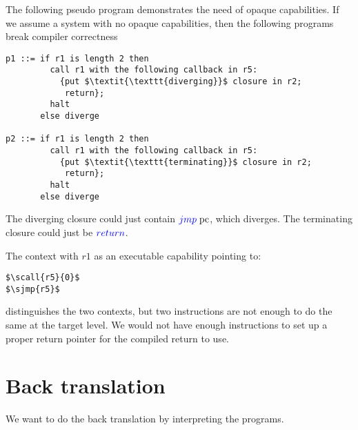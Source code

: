 \documentclass[a4paper]{article}
\newcommand{\sourcecolor}[1]{\color{blue}}
\newcommand{\src}[1]{{\sourcecolor{} #1}}
\newcommand{\zinstr}[1]{#1}
\newcommand{\oneinstr}[2]{
  \ifthenelse{\equal{#2}{}}
  {\zinstr{#1}}
  {\zinstr{#1} \; #2}
}
\newcommand{\twoinstr}[3]{
  \ifthenelse{\equal{#2#3}{}}
  {\zinstr{#1}}
  {\zinstr{#1} \; #2 \; #3}
}
\newcommand{\sreturn}{\zinstr{\src{return}}}
\newcommand{\sjmp}[1]{\oneinstr{\src{jmp}}{#1}}
\newcommand{\scall}[2]{\twoinstr{\src{call}}{#1}{#2}}
\newcommand{\pcreg}{\mathrm{pc}}
\begin{document}
The following pseudo program demonstrates the need of opaque capabilities. If we assume a system with no opaque capabilities, then the following programs break compiler correctness
\begin{lstlisting}[basicstyle=\sourcecolor{}\ttfamily] 
p1 ::= if r1 is length 2 then
         call r1 with the following callback in r5:
           {put $\textit{\texttt{diverging}}$ closure in r2;
            return};
         halt
       else diverge

p2 ::= if r1 is length 2 then
         call r1 with the following callback in r5:
           {put $\textit{\texttt{terminating}}$ closure in r2;
            return};
         halt
       else diverge
\end{lstlisting}
The diverging closure could just contain $\sjmp{\pcreg}$, which diverges. The terminating closure could just be $\sreturn$.

The context with $r1$ as an executable capability pointing to:
\begin{lstlisting}
$\scall{r5}{0}$
$\sjmp{r5}$
\end{lstlisting}
distinguishes the two contexts, but two instructions are not enough to do the same at the target level. We would not have enough instructions to set up a proper return pointer for the compiled return to use.

\clearpage
\section{Back translation}
We want to do the back translation by interpreting the programs.
\end{document}

